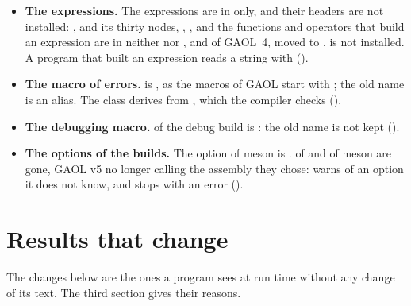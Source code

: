 \begin{itemize}
   too);  is no longer
  installed, and neither are the headers of the expressions, the next item
  ().
\item[$\bullet$] \textbf{The expressions.} The expressions are in
   only, and their headers are not installed:
  ,  and its thirty nodes, ,
  ,  and the functions and operators
  that build an expression are in neither  nor
  , and  of
  GAOL~4, moved to , is not installed. A program that built an expression reads a string
  with  ().\newinvfive
\item[$\bullet$] \textbf{The macro of errors.} 
  is , as the macros of GAOL start with
  ; the old name is an alias. The class  derives from
  , which the compiler checks
  ().\newinvfive
\item[$\bullet$] \textbf{The debugging macro.}  of the debug build is : the old name is
  not kept ().
\item[$\bullet$] \textbf{The options of the builds.} The option
   of meson is .  of
   and  of meson are gone, GAOL v5 no longer
  calling the assembly they chose:  warns of an option it does
  not know, and  stops with an error
  ().
\end{itemize}

\section{Results that change}\label{sec:migration-results}
%

The changes below are the ones a program sees at run time without any
change of its text. The third section gives their reasons.

